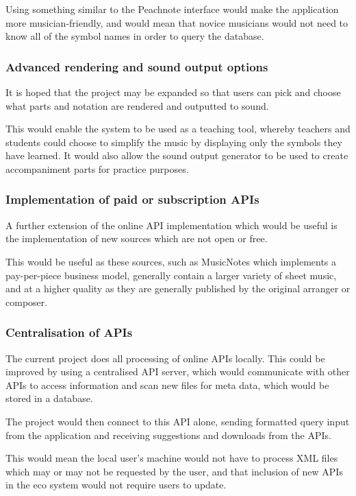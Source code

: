 Using something similar to the Peachnote interface would make the application more musician-friendly, and would mean that novice musicians would not need to know all of the symbol names in order to query the database.


\subsubsection{Advanced rendering and sound output options}
It is hoped that the project may be expanded so that users can pick and choose what parts and notation are rendered and outputted to sound. 

This would enable the system to be used as a teaching tool, whereby teachers and students could choose to simplify the music by displaying only the symbols they have learned. It would also allow the sound output generator to be used to create accompaniment parts for practice purposes.

\subsubsection{Implementation of paid or subscription APIs}
A further extension of the online API implementation which would be useful is the implementation of new sources which are not open or free. 

This would be useful as these sources, such as MusicNotes which implements a pay-per-piece business model, generally contain a larger variety of sheet music, and at a higher quality as they are generally published by the original arranger or composer.

\subsubsection{Centralisation of APIs}
The current project does all processing of online APIs locally. This could be improved by using a centralised API server, which would communicate with other APIs to access information and scan new files for meta data, which would be stored in a database.

The project would then connect to this API alone, sending formatted query input from the application and receiving suggestions and downloads from the APIs.

This would mean the local user's machine would not have to process XML files which may or may not be requested by the user, and that inclusion of new APIs in the eco system would not require users to update. 

